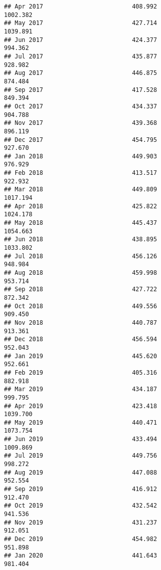 \documentclass[
]{article}
\begin{document}
\begin{verbatim}
## Apr 2017                         408.992                          1002.382
## May 2017                         427.714                          1039.891
## Jun 2017                         424.377                           994.362
## Jul 2017                         435.877                           928.982
## Aug 2017                         446.875                           874.484
## Sep 2017                         417.528                           849.394
## Oct 2017                         434.337                           904.788
## Nov 2017                         439.368                           896.119
## Dec 2017                         454.795                           927.670
## Jan 2018                         449.903                           976.929
## Feb 2018                         413.517                           922.932
## Mar 2018                         449.809                          1017.194
## Apr 2018                         425.822                          1024.178
## May 2018                         445.437                          1054.663
## Jun 2018                         438.895                          1033.802
## Jul 2018                         456.126                           948.984
## Aug 2018                         459.998                           953.714
## Sep 2018                         427.722                           872.342
## Oct 2018                         449.556                           909.450
## Nov 2018                         440.787                           913.361
## Dec 2018                         456.594                           952.043
## Jan 2019                         445.620                           952.661
## Feb 2019                         405.316                           882.918
## Mar 2019                         434.187                           999.795
## Apr 2019                         423.418                          1039.700
## May 2019                         440.471                          1073.754
## Jun 2019                         433.494                          1009.869
## Jul 2019                         449.756                           998.272
## Aug 2019                         447.088                           952.554
## Sep 2019                         416.912                           912.470
## Oct 2019                         432.542                           941.536
## Nov 2019                         431.237                           912.051
## Dec 2019                         454.982                           951.898
## Jan 2020                         441.643                           981.404

\end{verbatim}
\end{document}
